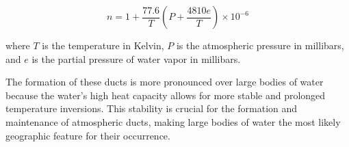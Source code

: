\[
n = 1 + \frac{77.6}{T} \left( P + \frac{4810 e}{T} \right) \times 10^{-6}
\]

where \( T \) is the temperature in Kelvin, \( P \) is the atmospheric pressure in millibars, and \( e \) is the partial pressure of water vapor in millibars.

The formation of these ducts is more pronounced over large bodies of water because the water's high heat capacity allows for more stable and prolonged temperature inversions. This stability is crucial for the formation and maintenance of atmospheric ducts, making large bodies of water the most likely geographic feature for their occurrence.

